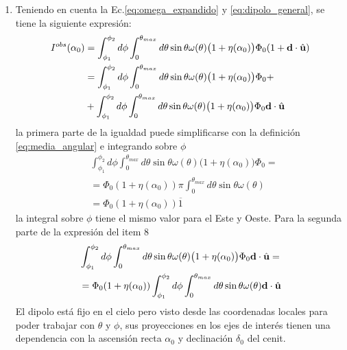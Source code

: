\begin{enumerate}
    \item Teniendo en cuenta la Ec.\ref{eq:omega_expandido} y \ref{eq:dipolo_general}, se tiene la siguiente expresión:
    \begin{align*}
        I^{obs}(\alpha_0) &= \int_{\phi_1}^{\phi_2} d\phi \int_{0}^{\theta_{max}} d\theta  \sin\theta \omega(\theta)\big(1 + \eta(\alpha_0) \big) \Phi_0 ( 1 +  \textbf{d}\cdot\hat{\bf{u}})\\
        &= \int_{\phi_1}^{\phi_2} d\phi \int_{0}^{\theta_{max}} d\theta \sin\theta \omega(\theta)\big(1 + \eta(\alpha_0) \big) \Phi_0 +\\
        &+\int_{\phi_1}^{\phi_2} d\phi \int_{0}^{\theta_{max}} d\theta \sin\theta \omega(\theta)\big(1 + \eta(\alpha_0) \big) \Phi_0 \textbf{d}\cdot\hat{\bf{u}}
    \end{align*}
    \noindent la primera parte  de la igualdad  puede simplificarse con la definición \ref{eq:media_angular} e integrando sobre $\phi$
    \begin{align*}
        &\int_{\phi_1}^{\phi_2} d\phi \int_{0}^{\theta_{max}} d\theta \sin\theta \omega(\theta)\big(1 + \eta(\alpha_0) \big) \Phi_0 =\\
        &= \Phi_0 (1+ \eta(\alpha_0)) \pi \int_{0}^{\theta_{max}}  d\theta \sin\theta \omega(\theta)\\
        &= \Phi_0 (1+ \eta(\alpha_0)) \overline{1} 
    \end{align*}
    \noindent la integral sobre $\phi$ tiene el mismo valor para el Este y Oeste. Para la segunda parte de la expresión del item 8
    \begin{align}
        &\int_{\phi_1}^{\phi_2} d\phi \int_{0}^{\theta_{max}} d\theta \sin\theta \omega(\theta)\big(1 + \eta(\alpha_0) \big) \Phi_0 \textbf{d}\cdot\hat{\bf{u}}=\\
        &=\Phi_0 (1+ \eta(\alpha_0))\int_{\phi_1}^{\phi_2} d\phi \int_{0}^{\theta_{max}}  d\theta \sin\theta \omega(\theta)\textbf{d}\cdot\hat{\bf{u}} \label{segundo_term}
    \end{align}
    \noindent El dipolo está fijo en el cielo pero visto desde las coordenadas locales para poder trabajar con $\theta$ y $\phi$, sus proyecciones en los ejes de interés tienen una dependencia con la ascensión recta  $\alpha_0$ y declinación $\delta_0$ del cenit. %

\end{enumerate}
